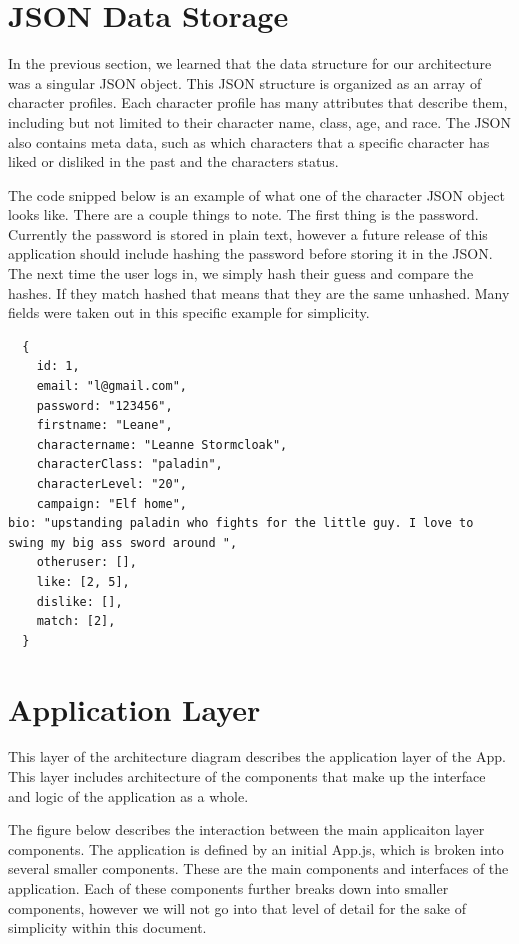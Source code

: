 \documentclass{article}
\begin{document}
	\newpage


	\section{JSON Data Storage}
	In the previous section, we learned that the data structure for our architecture was a singular
	JSON object. This JSON structure is organized as an array of character profiles. Each character
	profile has many attributes that describe them, including but not limited to their character
	name, class, age, and race. The JSON also contains meta data, such as which characters that a 
	specific character has liked or disliked in the past and the characters status.

	The code snipped below is an example of what one of the character JSON object looks like.
	There are a couple things to note. The first thing is the password. Currently the password is 
	stored in plain text, however a future release of this application should include hashing the
	password before storing it in the JSON. The next time the user logs in, we simply hash their guess
	and compare the hashes. If they match hashed that means that they are the same unhashed. 
	Many fields were taken out in this specific example for simplicity.

	\begin{verbatim}
  {
    id: 1,
    email: "l@gmail.com",
    password: "123456",
    firstname: "Leane",
    charactername: "Leanne Stormcloak",
    characterClass: "paladin",
    characterLevel: "20",
    campaign: "Elf home",
bio: "upstanding paladin who fights for the little guy. I love to swing my big ass sword around ",
    otheruser: [],
    like: [2, 5],
    dislike: [],
    match: [2],
  }
	\end{verbatim}

	\newpage
	\section{Application Layer}
	This layer of the architecture diagram describes the application layer of the App. This layer
	includes architecture of the components that make up the interface and logic of the application as a
	whole. 

	The figure below describes the interaction between the main applicaiton layer components. The application 
	is defined by an initial App.js, which is broken into several smaller components. These are the main
	components and interfaces of the application. Each of these components further breaks down into smaller
	components, however we will not go into that level of detail for the sake of simplicity within this
	document. 
\end{document}
